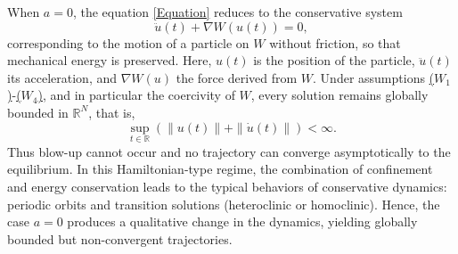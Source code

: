\documentclass[12pt]{amsart}
\numberwithin{equation}{section}
\begin{document}
When $a=0$, the equation \eqref{Equation} reduces to the conservative system
$$
\ddot u(t) + \nabla W(u(t))=0,
$$
corresponding to the motion of a particle on $W$ without friction, so that mechanical energy is preserved. Here, $u(t)$ is the position of the particle, $\ddot{u}(t)$ its acceleration, and $\nabla W(u)$ the force derived from $W$. Under assumptions \hyperlink{W1}{($W_1$)}-\hyperlink{W4}{($W_4$)}, and in particular the coercivity of $W$, every solution remains globally bounded in $\mathbb{R}^{N}$, that is, 
$$
\sup_{t\in\mathbb{R}}\left(\|u(t)\|+\|\dot u(t)\|\right)<\infty.
$$
Thus blow-up cannot occur and no trajectory can converge asymptotically to the equilibrium. In this Hamiltonian-type regime, the combination of confinement and energy conservation leads to the typical behaviors of conservative dynamics: periodic orbits and transition solutions (heteroclinic or homoclinic). Hence, the case $a=0$ produces a qualitative change in the dynamics, yielding globally bounded but non-convergent trajectories.
\end{document}
